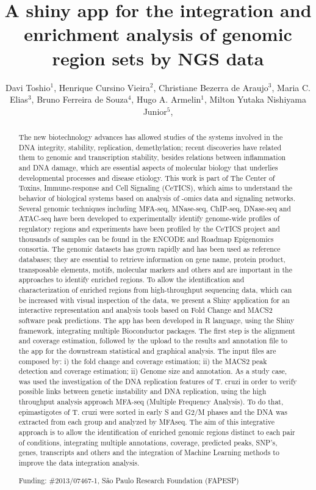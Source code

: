 \documentclass[twoside]{article}
\title{\vspace{-15mm}\fontsize{24pt}{10pt}\selectfont\textbf{ A shiny app for the integration and enrichment analysis of genomic region sets by NGS data }} %
\author{ Davi Toshio$^{1}$, Henrique Cursino Vieira$^{2}$, Christiane Bezerra de Araujo$^{3}$, Maria C. Elias$^{3}$, Bruno Ferreira de Souza$^{4}$, Hugo A. Armelin$^{1}$, Milton Yutaka Nishiyama Junior$^{5}$, }
\affil{ 1 Instituto Butantan

2 LECC-CeTICS, Instituto Butantan

3 LECC-CeTICS, Butantan Institute

4 ECC-CeTICS, Instituto Butantan

5 LETA-CeTICS, Instituto Butantan

 }
\date{}
\begin{document}
  
  
  \maketitle %
  
  
  \thispagestyle{fancy} %
  
  
  \begin{abstract}
  The new biotechnology advances has allowed studies of the systems involved in the DNA integrity, stability, replication, demethylation; recent discoveries have related them to genomic and transcription stability, besides relations between inflammation and DNA damage, which are essential aspects of molecular biology that underlies developmental processes and disease etiology. This work is part of The Center of Toxins, Immune-response and Cell Signaling (CeTICS), which aims to understand the behavior of biological systems based on analysis of -omics data and signaling networks. Several genomic techniques including MFA-seq, MNase-seq, ChIP-seq, DNase-seq and ATAC-seq have been developed to experimentally identify genome-wide profiles of regulatory regions and experiments have been profiled by the CeTICS project and thousands of samples can be found in the ENCODE and Roadmap Epigenomics consortia. The genomic datasets has grown rapidly and has been used as reference databases; they are essential to retrieve information on gene name, protein product, transposable elements, motifs, molecular markers and others and are important in the approaches to identify enriched regions. To allow the identification and characterization of enriched regions from high-throughput sequencing data, which can be increased with visual inspection of the data, we present a Shiny application for an interactive representation and analysis tools based on Fold Change and MACS2 software peak predictions. The app has been developed in R language, using the Shiny framework, integrating multiple Bioconductor packages. The first step is the alignment and coverage estimation, followed by the upload to the results and annotation file to the app for the downstream statistical and graphical analysis. The input files are composed by: i) the fold change and coverage estimation; ii) the MACS2 peak detection and coverage estimation; ii) Genome size and annotation. As a study case, was used the investigation of the DNA replication features of T. cruzi in order to verify possible links between genetic instability and DNA replication, using the high throughput analysis approach MFA-seq (Multiple Frequency Analysis). To do that, epimastigotes of T. cruzi were sorted in early S and G2/M phases and the DNA was extracted from each group and analyzed by MFAseq. The aim of this integrative approach is to allow the identification of enriched genomic regions distinct to each pair of conditions, integrating multiple annotations, coverage, predicted peaks, SNP’s, genes, transcripts and others and the integration of Machine Learning methods to improve the data integration analysis.
  
  Funding: \#2013/07467-1, S\~ao Paulo Research Foundation (FAPESP) \\ 
  \end{abstract}
  
\end{document}
